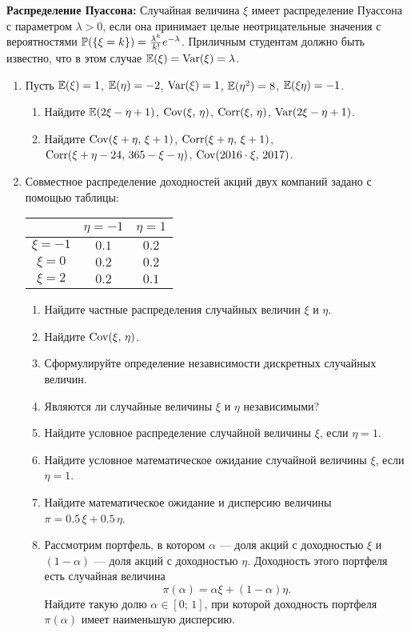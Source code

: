 \textbf{Распределение Пуассона:} Случайная величина $\xi$ имеет распределение Пуассона
с параметром $\lambda > 0$,  если она принимает целые неотрицательные значения с
вероятностями $\P(\{\xi = k\}) = \frac{\lambda^k}{k!}e^{-\lambda}$. Приличным
студентам должно быть известно, что в этом случае $\E(\xi) = \Var(\xi) = \lambda$.

\begin{enumerate}
\item Пусть $\E(\xi) = 1$, $\E(\eta) = -2$, $\Var(\xi) = 1$, $\E(\eta^2) = 8$, $\E(\xi \eta) = -1$. 
\begin{enumerate}
\item Найдите $\E(2\xi-\eta+1)$, $\Cov(\xi, \,\eta)$, $\Corr(\xi, \,\eta)$,  $\Var(2\xi-\eta+1)$.
\item Найдите $\Cov(\xi+\eta, \,\xi+1)$, $\Corr(\xi+\eta, \,\xi+1)$, $\Corr(\xi+\eta-24, \,365 - \xi - \eta)$, $\Cov(2016\cdot\xi, \, 2017)$.
\end{enumerate}

\item
Совместное распределение доходностей акций двух компаний задано с помощью таблицы:

\begin{center}
\begin{tabular}{ccc}
\toprule
         & $\eta=-1$ & $\eta=1$ \\ \midrule
$\xi=-1$  & $0.1$       & $0.2$ \\
$\xi=0$   & $0.2$       & $0.2$ \\
$\xi=2$   & $0.2$       & $0.1$ \\
\bottomrule
\end{tabular}
\end{center}

\begin{enumerate}
  \item Найдите частные распределения случайных величин $\xi$ и $\eta$.
  \item Найдите $\Cov(\xi,\,\eta)$.
  \item Сформулируйте определение независимости дискретных случайных величин.
  \item Являются ли случайные величины $\xi$ и $\eta$ независимыми?
  \item Найдите условное распределение случайной величины $\xi$, если $\eta = 1$.
  \item Найдите условное математическое ожидание случайной величины $\xi$, если $\eta = 1$.
  \item Найдите математическое ожидание и дисперсию величины $\pi = 0.5\, \xi + 0.5\, \eta$.
  \item Рассмотрим портфель, в котором $\alpha$ — доля акций с доходностью $\xi$
  и $(1 - \alpha)$ — доля акций с доходностью $\eta$. Доходность этого портфеля
  есть случайная величина
  \[
  \pi(\alpha) = \alpha \xi + (1-\alpha)\eta.
  \]
  Найдите такую долю $\alpha \in [0;\,1]$, при которой доходность портфеля $\pi(\alpha)$
  имеет наименьшую дисперсию.
\end{enumerate}


\end{enumerate}
